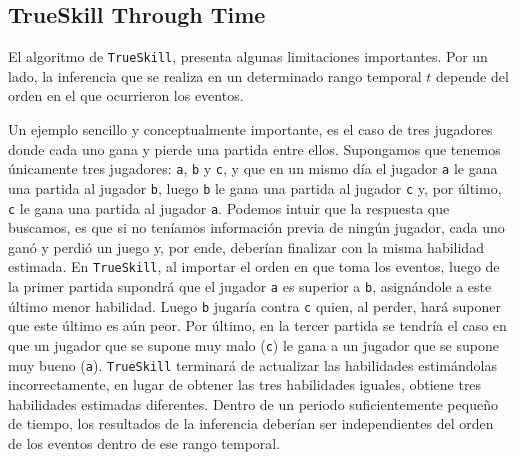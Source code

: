 \documentclass[11pt,twoside,spanish]{report} %
\begin{document}
\subsection{TrueSkill Through Time}

El algoritmo de \texttt{TrueSkill}, presenta algunas limitaciones importantes.
Por un lado, la inferencia que se realiza en un determinado rango temporal $t$ depende del orden en el que ocurrieron los eventos.

Un ejemplo sencillo y conceptualmente importante, es el caso de tres jugadores donde cada uno gana y pierde una partida entre ellos.
Supongamos que tenemos \'unicamente tres jugadores: \texttt{a}, \texttt{b} y \texttt{c}, y que en un mismo d\'ia el jugador \texttt{a} le gana una partida al jugador \texttt{b}, luego \texttt{b} le gana una partida al jugador \texttt{c} y, por \'ultimo, \texttt{c} le gana una partida al jugador \texttt{a}.
Podemos intuir que la respuesta que buscamos, es que si no ten\'iamos informaci\'on previa de ning\'un jugador, cada uno gan\'o y perdi\'o un juego y, por ende, deber\'ian finalizar con la misma habilidad estimada.
En \texttt{TrueSkill}, al importar el orden en que toma los eventos, luego de la primer partida supondr\'a que el jugador \texttt{a} es superior a \texttt{b}, asign\'andole a este \'ultimo menor habilidad.
Luego \texttt{b} jugar\'ia contra \texttt{c} quien, al perder, har\'a suponer que este \'ultimo es a\'un peor.
Por \'ultimo, en la tercer partida se tendr\'ia el caso en que un jugador que se supone muy malo (\texttt{c}) le gana a un jugador que se supone muy bueno (\texttt{a}).
\texttt{TrueSkill} terminar\'a de actualizar las habilidades estim\'andolas incorrectamente, en lugar de obtener las tres habilidades iguales, obtiene tres habilidades estimadas diferentes.
Dentro de un periodo suficientemente peque\~no de tiempo, los resultados de la inferencia deber\'ian ser independientes del orden de los eventos dentro de ese rango temporal.
\end{document}
